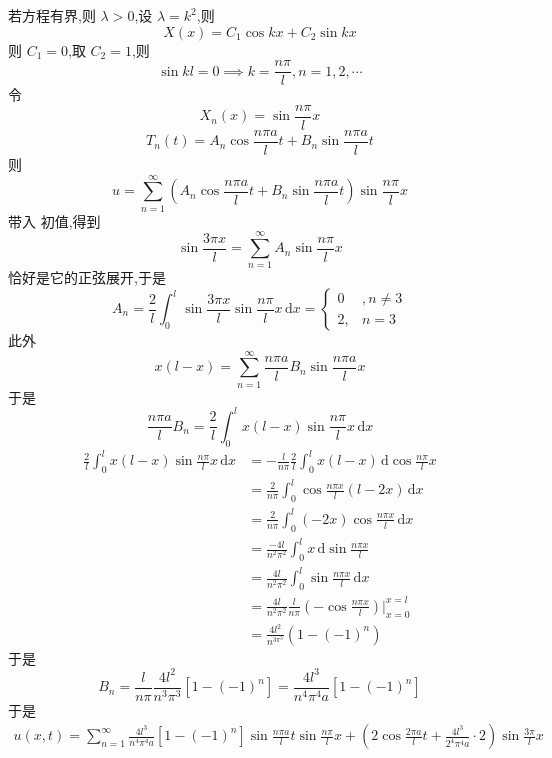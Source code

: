 \documentclass[../../PDE.tex]{subfiles}
\begin{document}
\begin{solution}
    若方程有界,则 \(   \lambda > 0  \),设 \(   \lambda = k^{2}  \),则 \[
    X\left( x \right)= C_1\cos kx+ C_2\sin kx 
    \] 则 \(  C_1= 0  \),取 \(  C_2= 1  \),则 \[
    \sin kl= 0\implies k=  \frac{n\pi  }{l }, n = 1,2,\cdots   
    \]    令 \[
    X_{n}\left( x \right)=  \sin  \frac{n\pi  }{l }x  
    \] \[
    T_{n}\left( t \right)= A_{n}\cos \frac{n\pi a }{l }t+ B_{n}\sin \frac{n\pi a }{l }t   
    \]则 \[
    u =  \sum _{n = 1}^{\infty} \left( A_{n}\cos \frac{n\pi a }{l }t+ B_{n}\sin \frac{n\pi a }{l }t   \right)\sin \frac{n\pi  }{l }x  
    \]带入 初值,得到 \[
    \sin \frac{3\pi x }{l }= \sum _{n = 1}^{\infty} A_{n}\sin \frac{n \pi }{l }x  
    \]恰好是它的正弦展开,于是 \[
    A_{n}= \frac{2 }{l } \int_{0}^{l}\sin \frac{3\pi x }{l } \sin \frac{n\pi  }{l }x\,\mathrm{d} x  = \begin{cases} 0&,n \neq 3\\ 
     2,& n = 3 \end{cases} 
    \]此外 \[
    x\left( l-x \right)= \sum _{n = 1}^{\infty}\frac{n\pi a  }{l }B_{n}\sin \frac{n\pi a }{l }x     
    \]于是 \[
    \frac{n\pi a  }{l }B_{n}= \frac{2 }{l }\int_{0}^{l}x\left( l-x \right)\sin \frac{n\pi  }{l }x\,\mathrm{d} x    
    \] \[
    \begin{aligned}
    \frac{2 }{l } \int_{0}^{l}x\left( l-x \right)\sin \frac{n\pi  }{l }x\,\mathrm{d} x&=  - \frac{l }{n\pi  }\frac{2 }{l } \int_{0}^{l}x\left( l-x \right)\,\mathrm{d}  \cos \frac{n\pi  }{l }x\\ 
     &= \frac{2 }{n\pi  }       \int_{0}^{l} \cos \frac{n\pi x }{l } \left( l-2x \right)\,\mathrm{d} x  \\ 
      &= \frac{2 }{n\pi  } \int_{0}^{l }\left( -2x \right)\cos \frac{n\pi x }{l }\,\mathrm{d} x\\ 
       &=   \frac{-4l }{n^{2}\pi ^{2} } \int_{0}^{l}x\,\mathrm{d}  \sin \frac{n\pi x }{l }\\ 
        &=  \frac{4l }{n^{2}\pi ^{2} } \int_{0}^{l} \sin \frac{n\pi x }{l }\,\mathrm{d} x \\ 
         &= \frac{4l }{n^{2}\pi ^{2} } \frac{l }{n\pi  }  \left( -\cos \frac{n\pi x }{l }  \right)|_{x= 0}^{x= l}   \\ 
          &= \frac{4l^{2} }{n^{3\pi ^{3}} }  \left( 1-\left( -1 \right)^{n}  \right)  
    \end{aligned}
    \]于是 \[
    B_{n}=  \frac{l }{n\pi  } \frac{4l^{2} }{ n^{3}\pi ^{3} }\left[ 1-\left( -1 \right)^{n}  \right]= \frac{4l^{3} }{ n^{4}\pi ^{4} a} \left[ 1-\left( -1 \right)^{n}  \right]     
    \]于是 \[
    \begin{aligned}
    u\left( x,t \right)= \sum _{n = 1}^{\infty} \frac{4l^{3} }{n^{4}\pi ^{4}a }\left[ 1-\left( -1 \right)^{n}  \right]\sin \frac{n\pi a }{l }t\sin \frac{n\pi  }{l }x+ \left( 2\cos \frac{2\pi a }{l }t+ \frac{4l^{3} }{2^{4}\pi ^{4}a }\cdot 2   \right) \sin \frac{3\pi  }{l }x        
    \end{aligned}
    \]
\end{solution}

\hspace*{\fill} 

\hspace*{\fill} 
\end{document}
